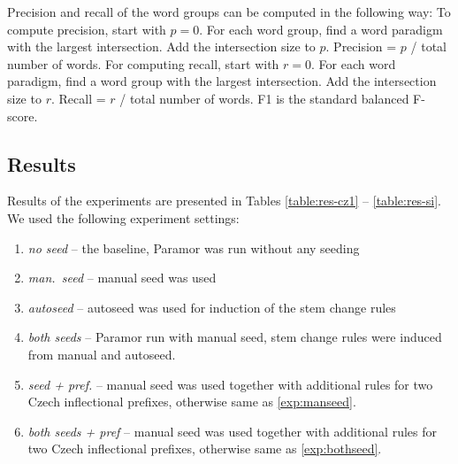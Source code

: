 \documentclass{itatnew}
\newcommand{\e}[1]{\textit{#1}} %
\begin{document}
Precision and recall of the word groups can be computed in the following way: To compute precision, start with $p = 0$. For each word group, find a word paradigm with the largest intersection. Add the intersection size to $p$. Precision = $p$ / total number of words. For computing recall, start with $r = 0$. For each word paradigm, find a word group with the largest intersection. Add the intersection size to $r$. Recall = $r$ / total number of words. F1 is the standard balanced F-score.

\subsection{Results}

\noindent
Results of the experiments are presented in Tables \ref{table:res-cz1} -- \ref{table:res-si}. We used the following experiment settings:\begin{enumerate}
\item \e{no seed} -- the baseline, Paramor was run without any seeding
\item \label{exp:manseed} \e{man.~seed} -- manual seed was used
\item \e{autoseed} -- autoseed was used for induction of the stem change rules
\item \label{exp:bothseed}
    \e{both seeds} -- Paramor run with manual seed, stem change rules were induced from manual and autoseed.
\item \e{seed + pref.} -- manual seed was used together with additional rules for two Czech inflectional prefixes, otherwise same as \ref{exp:manseed}.
\item \e{both seeds + pref} --  manual seed was used together with additional rules for two Czech inflectional prefixes, otherwise same as \ref{exp:bothseed}.
\end{enumerate}
\end{document}
